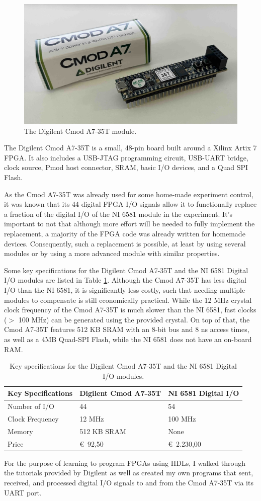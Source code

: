 \begin{figure}[ht]
    \centering
    \includegraphics[width=0.5\columnwidth]{images/chapter_2/digilent.jpeg}
    \caption{The Digilent Cmod A7-35T module.}
    \label{fig:ch2_digilent}
\end{figure}

The Digilent Cmod A7-35T is a small, 48-pin board built around a Xilinx Artix 7 FPGA. It also includes a USB-JTAG programming circuit, USB-UART bridge, clock source, Pmod host connector, SRAM, basic I/O devices, and a Quad SPI Flash.

As the Cmod A7-35T was already used for some home-made experiment control, it was known that its 44 digital FPGA I/O signals allow it to functionally replace a fraction of the digital I/O of the NI 6581 module in the experiment. It's important to not that although more effort will be needed to fully implement the replacement, a majority of the FPGA code was already written for homemade devices. Consequently, such a replacement is possible, at least by using several modules or by using a more advanced module with similar properties.

Some key specifications for the Digilent Cmod A7-35T and the NI 6581 Digital I/O modules are listed in Table \ref{tab:digilent_ni}. Although the Cmod A7-35T has less digital I/O than the NI 6581, it is significantly less costly, such that needing multiple modules to compensate is still economically practical. While the 12 MHz crystal clock frequency of the Cmod A7-35T is much slower than the NI 6581, fast clocks ($>$ 100 MHz) can be generated using the provided crystal. On top of that, the Cmod A7-35T features 512 KB SRAM with an 8-bit bus and 8 ns access times, as well as a 4MB Quad-SPI Flash, while the NI 6581 does not have an on-board RAM.

\begin{table}[h!]
    \centering
    \begin{tabular}{ p{5cm} | p{5cm} | p{5cm} }
        \hline
        \textbf{Key Specifications} & \textbf{Digilent Cmod A7-35T}
            & \textbf{NI 6581 Digital I/O} \\
        \hline
        Number of I/O & 44 & 54 \\
        Clock Frequency & 12 MHz & 100 MHz \\
        Memory & 512 KB SRAM & None \\
        Price & \euro\ 92,50 & \euro\ 2.230,00 \\
        \hline
    \end{tabular}
    \caption{Key specifications for the Digilent Cmod A7-35T and the NI 6581 Digital I/O modules.}
    \label{tab:digilent_ni}
\end{table}

For the purpose of learning to program FPGAs using HDLs, I walked through the tutorials provided by Digilent as well as created my own programs that sent, received, and processed digital I/O signals to and from the Cmod A7-35T via its UART port.
